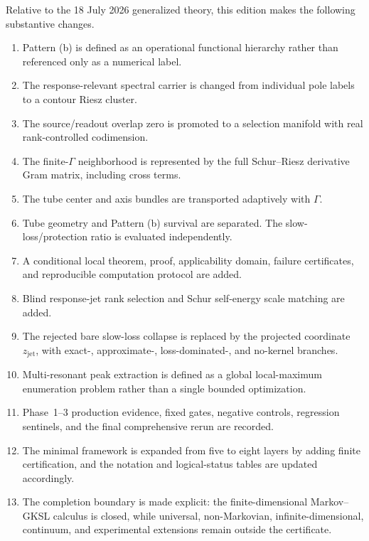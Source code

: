 \documentclass[11pt]{article}
\theoremstyle{definition}
\theoremstyle{remark}
\begin{document}
Relative to the 18 July 2026 generalized theory, this edition makes the following substantive changes.
\begin{enumerate}
  \item Pattern (b) is defined as an operational functional hierarchy rather than referenced only as a numerical label.
  \item The response-relevant spectral carrier is changed from individual pole labels to a contour Riesz cluster.
  \item The source/readout overlap zero is promoted to a selection manifold with real rank-controlled codimension.
  \item The finite-$\Gamma$ neighborhood is represented by the full Schur--Riesz derivative Gram matrix, including cross terms.
  \item The tube center and axis bundles are transported adaptively with $\Gamma$.
  \item Tube geometry and Pattern (b) survival are separated.  The slow-loss/protection ratio is evaluated independently.
  \item A conditional local theorem, proof, applicability domain, failure certificates, and reproducible computation protocol are added.
  \item Blind response-jet rank selection and Schur self-energy scale matching are added.
  \item The rejected bare slow-loss collapse is replaced by the projected coordinate $z_{\mathrm{jet}}$, with exact-, approximate-, loss-dominated-, and no-kernel branches.
  \item Multi-resonant peak extraction is defined as a global local-maximum enumeration problem rather than a single bounded optimization.
  \item Phase~1--3 production evidence, fixed gates, negative controls, regression sentinels, and the final comprehensive rerun are recorded.
  \item The minimal framework is expanded from five to eight layers by adding finite certification, and the notation and logical-status tables are updated accordingly.
  \item The completion boundary is made explicit: the finite-dimensional Markov--GKSL calculus is closed, while universal, non-Markovian, infinite-dimensional, continuum, and experimental extensions remain outside the certificate.
\end{enumerate}
\end{document}
